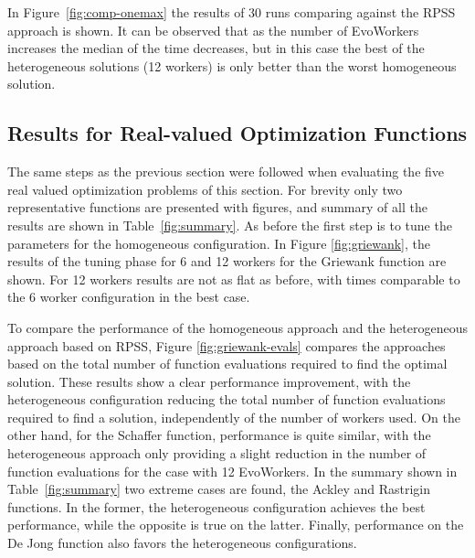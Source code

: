 \documentclass{llncs}
\begin{document}
In Figure~\ref{fig:comp-onemax} the results of 30 runs comparing against the RPSS approach is shown.
It can be observed that as the number of EvoWorkers increases the median of the time decreases, but
in this case the best of the heterogeneous solutions (12 workers) is only better than the worst homogeneous
solution. %

\subsection{Results for Real-valued Optimization Functions}
The same steps as the previous section were followed when evaluating the five real valued 
optimization problems of this section.  For brevity only two representative functions are 
presented with figures, and summary of all the results are shown in Table~\ref{fig:summary}. As before
the first step is to tune the parameters for the homogeneous configuration.
In Figure \ref{fig:griewank}, the results of the tuning phase for 6 and 12 workers 
for the Griewank function are shown. For 12 workers results are not as flat as before, 
with times comparable to the 6 worker configuration in the best case.

To compare the performance of the homogeneous approach and the heterogeneous approach based on RPSS,
Figure \ref{fig:griewank-evals} compares the approaches based on the total number of function 
evaluations required to find the optimal solution.
These results show a clear performance improvement, with the heterogeneous configuration 
reducing the total number of function evaluations required to find a solution,
independently of the number of workers used.
On the other hand, for the Schaffer function, performance is quite similar,
with the heterogeneous approach only providing a slight reduction in the number 
of function evaluations for the case with 12 EvoWorkers.
In the summary shown in Table~\ref{fig:summary} two extreme cases are found, the Ackley and Rastrigin functions.
In the former, the heterogeneous configuration achieves the best performance, while the opposite is true on the latter.
Finally, performance on the De Jong function also favors the heterogeneous configurations.
\end{document}
